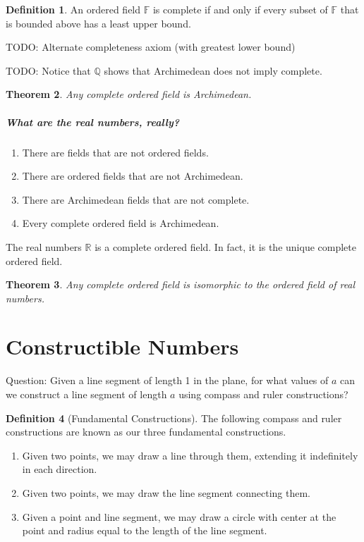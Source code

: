 \documentclass[11pt]{article}
\newtheorem{theorem}{Theorem}[section]
\theoremstyle{definition}
\newtheorem{definition}[theorem]{Definition}
\begin{document}
\begin{definition}
  An ordered field $\mathbb{F}$ is complete if and only if every subset of $\mathbb{F}$ that is bounded above has a least upper bound.
\end{definition}

TODO: Alternate completeness axiom (with greatest lower bound)

TODO: Notice that $\mathbb{Q}$ shows that Archimedean does not imply complete.

\begin{theorem}
  Any complete ordered field is Archimedean.
  \label{theorem: complete implies archimedean}
\end{theorem}

\subsubsection{What are the real numbers, really?}

\begin{enumerate}
  \item There are fields that are not ordered fields.
  \item There are ordered fields that are not Archimedean.
  \item There are Archimedean fields that are not complete.
  \item Every complete ordered field is Archimedean.
\end{enumerate}

The real numbers $\mathbb{R}$ is a complete ordered field. In fact, it is the unique complete ordered field.

\begin{theorem}
  Any complete ordered field is isomorphic to the ordered field of real numbers.
  \label{theorem: reals are unique}
\end{theorem}

\part{Constructible Numbers}

Question: Given a line segment of length 1 in the plane, for what values of $a$ can we construct a line segment of length $a$ using compass and ruler constructions?

\begin{definition}[Fundamental Constructions] The following compass and ruler constructions are known as our three fundamental constructions.
  \begin{enumerate}
    \item Given two points, we may draw a line through them, extending it indefinitely in each direction.
    \item Given two points, we may draw the line segment connecting them.
    \item Given a point and line segment, we may draw a circle with center at the point and radius equal to the length of the line segment.
  \end{enumerate}
\end{definition}
\end{document}
